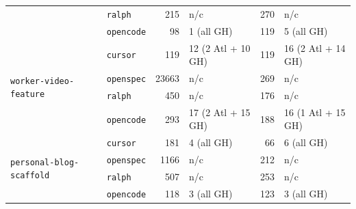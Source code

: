 \begin{table}[h]
\begin{tabular}{ll rl rl}
  & \texttt{ralph}      &  215 & n/c                & 270 & n/c                 \\
  & \texttt{opencode} &   98 & 1 (all GH)         & 119 & 5 (all GH)          \\
\midrule
\multirow{4}{*}{\texttt{worker-video-feature}}
  & \texttt{cursor}     &   119 & 12 (2 Atl + 10 GH) & 119 & 16 (2 Atl + 14 GH)  \\
  & \texttt{openspec}   & 23663 & n/c                & 269 & n/c                 \\
  & \texttt{ralph}      &   450 & n/c                & 176 & n/c                 \\
  & \texttt{opencode} &   293 & 17 (2 Atl + 15 GH) & 188 & 16 (1 Atl + 15 GH)  \\
\midrule
\multirow{4}{*}{\texttt{personal-blog-scaffold}}
  & \texttt{cursor}     &  181 & 4 (all GH)         &  66 & 6 (all GH)          \\
  & \texttt{openspec}   & 1166 & n/c                & 212 & n/c                 \\
  & \texttt{ralph}      &  507 & n/c                & 253 & n/c                 \\
  & \texttt{opencode} &  118 & 3 (all GH)         & 123 & 3 (all GH)          \\
\bottomrule
\end{tabular}
\end{table}

